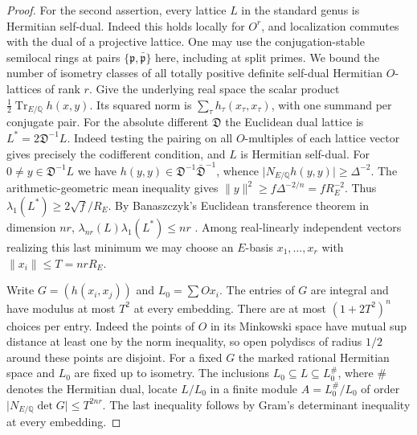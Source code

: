 \begin{proof}
For the second assertion, every lattice \(L\) in the standard genus
is Hermitian self-dual. Indeed this holds locally for \(O^r\), and
localization commutes with the dual of a projective lattice. One may
use the conjugation-stable semilocal rings at pairs
\(\{\mathfrak p,\bar{\mathfrak p}\}\) here, including at split primes.
We bound the number of isometry classes of all totally positive
definite self-dual Hermitian \(O\)-lattices of rank \(r\).
Give the underlying real space the scalar product
\(\tfrac12\operatorname{Tr}_{E/\mathbb Q}h(x,y)\). Its squared norm
is \(\sum_\tau h_\tau(x_\tau,x_\tau)\), with one summand per conjugate
pair. For the absolute different \(\mathfrak D\) the Euclidean
dual lattice is \(L^*=2\mathfrak D^{-1}L\). Indeed testing the
pairing on all \(O\)-multiples of each lattice vector gives precisely
the codifferent condition, and \(L\) is Hermitian self-dual.
For \(0\ne y\in\mathfrak D^{-1}L\) we have
\(h(y,y)\in\mathfrak D^{-1}\bar{\mathfrak D}^{-1}\), whence
\(\lvert N_{E/\mathbb Q}h(y,y)\rvert\ge\Delta^{-2}\).
The arithmetic-geometric mean inequality gives
\(\|y\|^2\ge f\Delta^{-2/n}=fR_E^{-2}\).
Thus \(\lambda_1(L^*)\ge 2\sqrt f/R_E\).
By Banaszczyk's Euclidean transference theorem in dimension \(nr\),
\(\lambda_{nr}(L)\lambda_1(L^*)\le nr\)
\cite[Theorem~2.1]{banaszczyk}. Among real-linearly independent
vectors realizing this last minimum we may choose an \(E\)-basis
\(x_1,\ldots,x_r\) with \(\|x_i\|\le T=nrR_E\).

Write \(G=(h(x_i,x_j))\) and \(L_0=\sum O x_i\). The entries of
\(G\) are integral and have modulus at most \(T^2\) at every
embedding. There are at most \((1+2T^2)^n\) choices per entry.
Indeed the points of \(O\) in its Minkowski space have mutual sup distance
at least one by the norm inequality, so open polydiscs of radius
\(1/2\) around these points are disjoint. For a fixed \(G\) the marked
rational Hermitian space and \(L_0\) are fixed up to isometry.
The inclusions \(L_0\subseteq L\subseteq L_0^\#\), where \(\#\)
denotes the Hermitian dual, locate \(L/L_0\) in a finite module
\(A=L_0^\#/L_0\) of order \(\lvert N_{E/\mathbb Q}\det G\rvert
\le T^{2nr}\). The last inequality follows by Gram's determinant
inequality at every embedding.


\end{proof}
